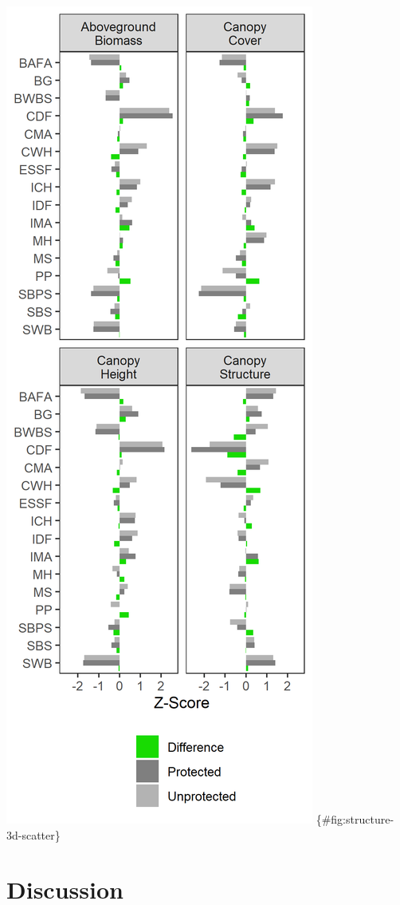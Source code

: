 \documentclass[11pt]{article}
\makeatletter
\def\maxwidth{\ifdim\Gin@nat@width>\linewidth\linewidth
\else\Gin@nat@width\fi}
\let\Oldincludegraphics\includegraphics
\renewcommand{\includegraphics}[1]{\Oldincludegraphics[width=\maxwidth]{#1}}
\makeatother
\begin{document}
\includegraphics{figures/fstruct_zscores.png}
\{\#fig:structure-3d-scatter\}

\hypertarget{discussion}{%
\section{Discussion}\label{discussion}}
\end{document}
